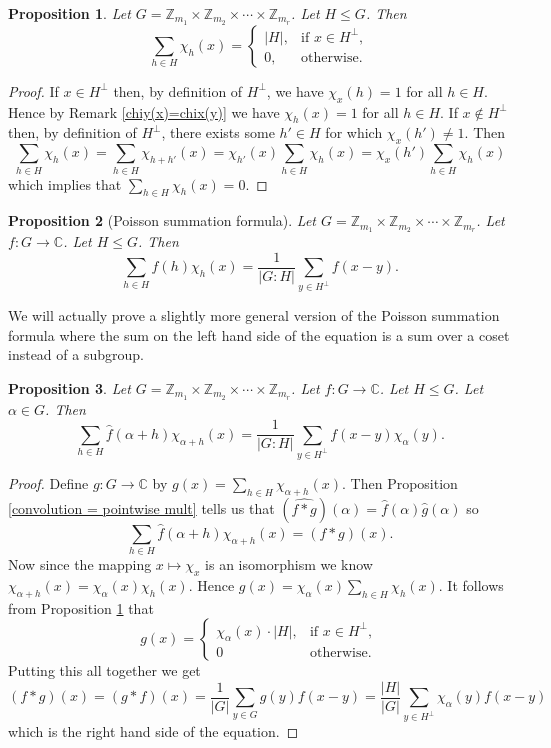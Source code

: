 \documentclass[12pt]{article}
\newtheorem{Proposition}{Proposition}
\newcommand{\Z}{\mathbb{Z}}
\newcommand{\C}{\mathbb{C}}
\newcommand{\Zm}{\Z_{m_1}\times \Z_{m_2} \times \cdots \times \Z_{m_r}}
\begin{document}
\begin{Proposition} \label{generalised orthogonality}
    Let $G = \Zm$. Let $H\leq G$. Then
    \[
        \sum_{h\in H}\chi_h(x) = \begin{cases}
            |H|, & \text{if }x\in H^\perp, \\
            0,   & \text{otherwise.}
        \end{cases}
    \]
\end{Proposition}
\begin{proof}
    If $x\in H^\perp$ then, by definition of $H^\perp$, we have $\chi_x(h)=1$ for all $h\in H$. Hence by Remark \ref{chiy(x)=chix(y)} we have $\chi_h(x)=1$ for all $h\in H$. If $x\not\in H^\perp$ then, by definition of $H^\perp$, there exists some $h'\in H$ for which $\chi_{x}(h') \neq 1$. Then
    \[
        \sum_{h\in H}\chi_{h}(x) = \sum_{h\in H}\chi_{h+h'}(x) = \chi_{h'}(x)\sum_{h\in H}\chi_h(x)=\chi_x(h')\sum_{h\in H}\chi_h(x)
    \]
    which implies that $\sum_{h\in H}\chi_{h}(x) =0$.

\end{proof}


\begin{Proposition}[Poisson summation formula]
    Let $G = \Zm$.
    Let $f:G\to \C$.
    Let $H\leq G$.
    Then
    \[
        \sum_{h\in H}\widehat{f}(h)\chi_{h}(x) = \frac{1}{|G:H|}\sum_{y\in H^\perp}f(x-y).
    \]
\end{Proposition}

We will actually prove a slightly more general version of the Poisson summation formula where the sum on the left hand side of the equation is a sum over a coset instead of a subgroup.

\begin{Proposition} \label{generalised poisson}
    Let $G = \Zm$.
    Let $f:G\to \C$.
    Let $H\leq G$.
    Let $\alpha\in G$.
    Then
    \[
        \sum_{h\in H}\widehat{f}(\alpha+h)\chi_{\alpha+h}(x) = \frac{1}{|G:H|}\sum_{y\in H^\perp}f(x-y)\chi_\alpha(y).
    \]
\end{Proposition}
\begin{proof}
    Define $g:G\to \C$ by $g(x) = \sum_{h\in H}\chi_{\alpha+h}(x)$. Then Proposition \ref{convolution = pointwise mult} tells us that $(\widehat{f*g})(\alpha) = \widehat{f}(\alpha)\widehat{g}(\alpha)$ so
    \[
        \sum_{h\in H}\widehat{f}(\alpha+h)\chi_{\alpha+h}(x) = (f*g)(x).
    \]
    Now since the mapping $x\mapsto \chi_x$ is an isomorphism we know $\chi_{\alpha+h}(x) = \chi_{\alpha}(x)\chi_{h}(x)$. Hence $g(x) = \chi_\alpha(x)\sum_{h\in H}\chi_h(x)$.  It follows from Proposition \ref{generalised orthogonality} that
    \[
        g(x) = \begin{cases}\chi_{\alpha}(x)\cdot |H|, & \text{if }x\in H^\perp, \\0 & \text{otherwise.} \end{cases}
    \]
    Putting this all together we get
    \[
        (f*g)(x) = (g*f)(x) = \frac{1}{|G|}\sum_{y\in G}g(y)f(x-y) = \frac{|H|}{|G|}\sum_{y\in H^\perp}\chi_\alpha(y)f(x-y)
    \]
    which is the right hand side of the equation.
\end{proof}
\end{document}
